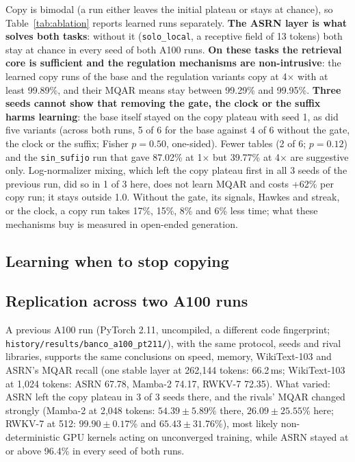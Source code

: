 \documentclass[11pt]{article}
\begin{document}
Copy is bimodal (a run either leaves the initial plateau or stays at chance), so Table~\ref{tab:ablation} reports
learned runs separately. \textbf{The ASRN layer is what solves both tasks}: without
it (\texttt{solo\_local}, a receptive field of 13 tokens) both stay at chance in every seed of both A100 runs.
\textbf{On these tasks the retrieval core is sufficient and the regulation mechanisms are non-intrusive}: the learned
copy runs of the base and the regulation variants copy at 4$\times$ with at least 99.89\%, and their MQAR means stay
between 99.29\% and 99.95\%. \textbf{Three seeds cannot show that removing the gate, the clock or the suffix harms
learning}: the base itself stayed on the copy plateau with seed 1, as did five variants (across both runs, 5 of 6 for
the base against 4 of 6 without the gate, the clock or the suffix; Fisher $p=0.50$, one-sided). Fewer tables (2 of 6;
$p=0.12$) and the \texttt{sin\_sufijo} run that gave 87.02\% at 1$\times$ but 39.77\% at 4$\times$ are suggestive only.
Log-normalizer mixing, which left the copy plateau first in all 3 seeds of the previous run, did so in 1 of 3 here,
does not learn MQAR and costs +62\% per copy run; it stays outside 1.0. Without the gate, its signals, Hawkes and
streak, or the clock, a copy run takes 17\%, 15\%, 8\% and 6\% less time; what these mechanisms buy is measured in
open-ended generation.

\subsection{Learning when to stop copying}
\label{sec:quote}



\subsection{Replication across two A100 runs}
\label{sec:replication}

A previous A100 run (PyTorch 2.11, uncompiled, a different code fingerprint;
\nolinkurl{history/results/banco_a100_pt211/}), with the same protocol, seeds and rival libraries, supports the same
conclusions on speed, memory, WikiText-103 and ASRN's MQAR recall (one stable layer at 262{,}144 tokens: 66.2\,ms;
WikiText-103 at 1{,}024 tokens: ASRN 67.78, Mamba-2 74.17, RWKV-7 72.35). What varied: ASRN left the copy plateau in 3
of 3 seeds there, and the rivals' MQAR changed strongly (Mamba-2 at 2{,}048 tokens: $54.39\pm5.89$\% there,
$26.09\pm25.55$\% here; RWKV-7 at 512: $99.90\pm0.17$\% and $65.43\pm31.76$\%), most likely non-deterministic GPU
kernels acting on unconverged training, while ASRN stayed at or above 96.4\% in every seed of both runs.
\end{document}

